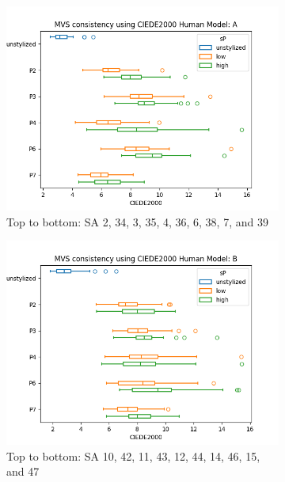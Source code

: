\begin{figure}[ht]
	\centering
	\begin{subfigure}{0.49\textwidth}
		\includegraphics[width=\linewidth]{Figures/results/good/ciede2000_dora.png}
		\caption{Top to bottom: SA 2, 34, 3, 35, 4, 36, 6, 38, 7, and 39}
		\label{fig:ciede2000_dora}
	\end{subfigure}
	\begin{subfigure}{0.49\textwidth}
		\includegraphics[width=\linewidth]{Figures/results/good/ciede2000_ephra.png}
		\caption{Top to bottom: SA 10, 42, 11, 43, 12, 44, 14, 46, 15, and 47}
		\label{fig:ciede2000_ephra}
	\end{subfigure}
	\begin{subfigure}{0.49\textwidth}

\end{subfigure}
\end{figure}
